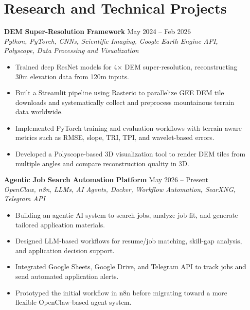 \documentclass[a4paper,10pt]{article}
\begin{document}

\section*{Research and Technical Projects}

\noindent
\textbf{DEM Super-Resolution Framework} \hfill May 2024 -- Feb 2026 \\
\textit{Python, PyTorch, CNNs, Scientific Imaging, Google Earth Engine API, Polyscope, Data Processing and Visualization}
\begin{itemize}[leftmargin=0.25in]
    \item Trained deep ResNet models for 4$\times$ DEM super-resolution, reconstructing 30m elevation data from 120m inputs.
    \item Built a Streamlit pipeline using Rasterio to parallelize GEE DEM tile downloads and systematically collect and preprocess mountainous terrain data worldwide.
    \item Implemented PyTorch training and evaluation workflows with terrain-aware metrics such as RMSE, slope, TRI, TPI, and wavelet-based errors.
    \item Developed a Polyscope-based 3D visualization tool to render DEM tiles from multiple angles and compare reconstruction quality in 3D.
\end{itemize}

\noindent
\textbf{Agentic Job Search Automation Platform} \hfill May 2026 -- Present \\
\textit{OpenClaw, n8n, LLMs, AI Agents, Docker, Workflow Automation, SearXNG, Telegram API}
\begin{itemize}[leftmargin=0.25in]
    \item Building an agentic AI system to search jobs, analyze job fit, and generate tailored application materials.
    \item Designed LLM-based workflows for resume/job matching, skill-gap analysis, and application decision support.
    \item Integrated Google Sheets, Google Drive, and Telegram API to track jobs and send automated application alerts.
    \item Prototyped the initial workflow in n8n before migrating toward a more flexible OpenClaw-based agent system.
\end{itemize}
\end{document}
